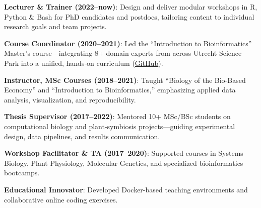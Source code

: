 \documentclass[a4paper,10pt]{article}
\begin{document}
\begin{description}
  \raggedright
  \item \textbf{Lecturer \& Trainer (2022–now)}: Design and deliver modular workshops in R, Python \& Bash for PhD candidates and postdocs, tailoring content to individual research goals and team projects.
  \item \textbf{Course Coordinator (2020–2021)}: Led the “Introduction to Bioinformatics” Master’s course—integrating 8+ domain experts from across Utrecht Science Park into a unified, hands-on curriculum (\href{https://github.com/lauralwd/metagenomicspractical}{GitHub}).
  \item \textbf{Instructor, MSc Courses (2018–2021)}: Taught “Biology of the Bio-Based Economy” and “Introduction to Bioinformatics,” emphasizing applied data analysis, visualization, and reproducibility.
  \item \textbf{Thesis Supervisor (2017–2022)}: Mentored 10+ MSc/BSc students on computational biology and plant-symbiosis projects—guiding experimental design, data pipelines, and results communication.
  \item \textbf{Workshop Facilitator \& TA (2017–2020)}: Supported courses in Systems Biology, Plant Physiology, Molecular Genetics, and specialized bioinformatics bootcamps.
  \item \textbf{Educational Innovator}: Developed Docker-based teaching environments and collaborative online coding exercises.
\end{description}
\end{document}
